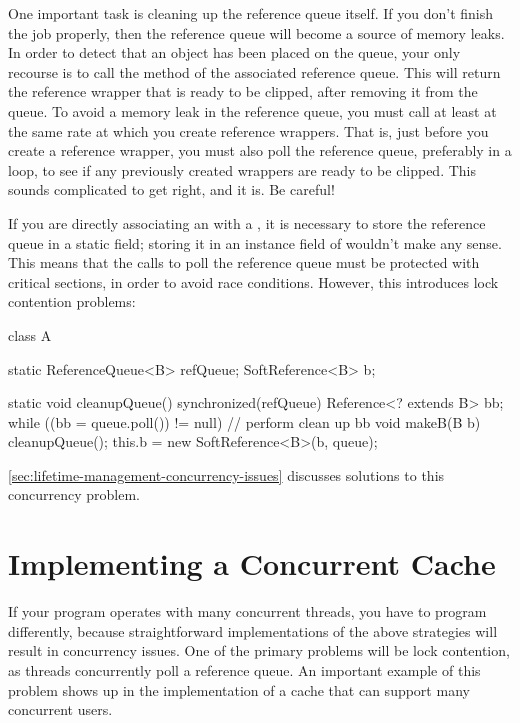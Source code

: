 One important task is cleaning up the reference queue itself. If you don't finish
the job properly, then the reference queue will become a source of memory leaks.
In order to detect that an object has been placed on the queue, your only
recourse is to call the  method of the associated reference queue.
This will return the reference wrapper that is ready to be clipped, after
removing it from the queue. To avoid a memory leak in the reference queue, you
must call  at least at the same rate at which you create reference
wrappers. That is, just before you create a reference wrapper, you must also poll
the reference queue, preferably in a loop, to see if any previously created
wrappers are ready to be clipped. This sounds complicated to get right, and it
is. Be careful!

If you are directly associating an  with a , it is 
necessary to store the reference queue in a static field; storing it in an
instance field of  wouldn't make any sense. This means that the calls
to poll the reference queue must be protected with critical sections, in order
to avoid race conditions. However, this introduces lock contention problems:
\begin{shortlisting}
class A {
   static ReferenceQueue<B> refQueue;
   SoftReference<B> b;
   
   static void cleanupQueue() {
      synchronized(refQueue) {
         Reference<? extends B> bb;
         while ((bb = queue.poll()) != null) {
            // perform clean up bb
         }
      }
   }
   void makeB(B b) {
      cleanupQueue();   
      this.b = new SoftReference<B>(b, queue);
   }
}
\end{shortlisting}
\autoref{sec:lifetime-management-concurrency-issues} discusses solutions to this
concurrency problem.


\section{Implementing a Concurrent Cache}
\label{sec:lifetime-management-concurrency-issues}

If your program operates with many concurrent threads, you have to program
differently, because straightforward implementations of the above strategies will
result in concurrency issues. One of the primary problems will be lock
contention, as threads concurrently poll a reference queue. An important example
of this problem shows up in the implementation of a cache that can support many
concurrent users.

